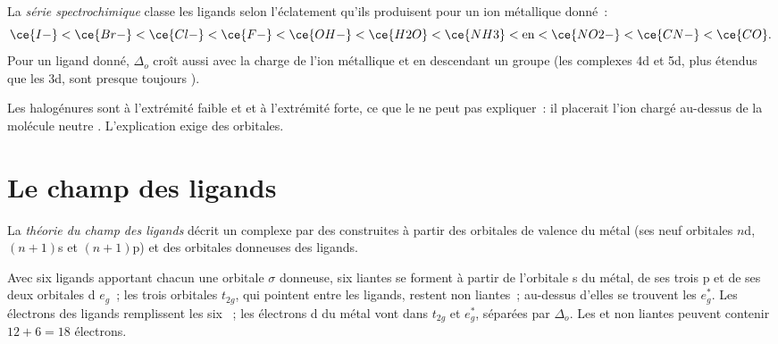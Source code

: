 \begin{definition}\label{def:b2:ligand-field:spectrochemical}
La \emph{série spectrochimique} classe les ligands selon
l'éclatement qu'ils produisent pour un ion métallique donné~:
\[
  \ce{I-} < \ce{Br-} < \ce{Cl-} < \ce{F-} < \ce{OH-} < \ce{H2O} < \ce{NH3} < \text{en} <
  \ce{NO2-} < \ce{CN-} < \ce{CO} .
\]
Pour un ligand donné, $\Delta_o$ croît aussi avec la charge de l'ion métallique et en descendant un groupe
(les complexes 4d et 5d, plus étendus que les 3d, sont presque toujours ).
\end{definition}

Les halogénures sont à l'extrémité faible et  et  à l'extrémité forte, ce que le
 ne peut pas expliquer~: il placerait l'ion chargé  au-dessus de la molécule neutre
. L'explication exige des orbitales.

\section{Le champ des ligands}

\begin{definition}\label{def:b2:ligand-field:ligand-field}
La \emph{théorie du champ des ligands} décrit un complexe par des 
construites à partir des orbitales de valence du métal (ses neuf orbitales $n$d, $(n+1)$s et $(n+1)$p)
et des orbitales donneuses des ligands.
\end{definition}

\begin{proposition}\label{prop:b2:ligand-field:mo-octahedral}
Avec six ligands apportant chacun une orbitale $\sigma$ donneuse, six  liantes se forment
à partir de l'orbitale s du métal, de ses trois p et de ses deux orbitales d $e_g$~; les trois orbitales $t_{2g}$, qui
pointent entre les ligands, restent non liantes~; au-dessus d'elles se trouvent les  $e_g^*$.
Les électrons des ligands remplissent les six ~; les électrons d du métal vont
dans $t_{2g}$ et $e_g^*$, séparées par $\Delta_o$. Les  et non liantes peuvent contenir
$12 + 6 = 18$ électrons.
\end{proposition}


